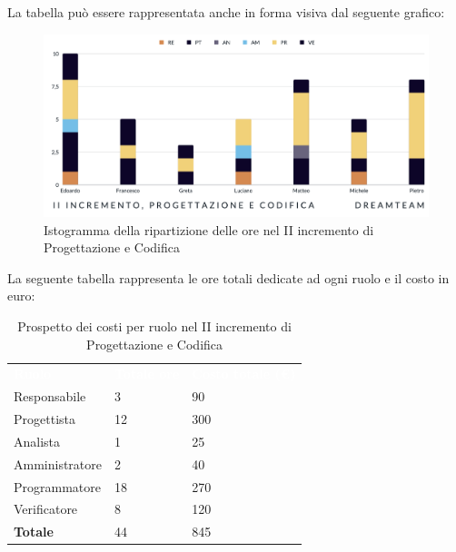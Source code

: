 La tabella può essere rappresentata anche in forma visiva dal seguente grafico:
\begin{figure}[H]
\centering
\includegraphics[scale=0.50]{Sezioni/SezioniPreventivo/grafici/progettazione/Progettazione_II_incremento.png}
\caption{Istogramma della ripartizione delle ore nel II incremento di Progettazione e Codifica}
\end{figure}

La seguente tabella rappresenta le ore totali dedicate ad ogni ruolo e il costo in euro:

\begin{table}[H]
\begin{center}
\renewcommand{\arraystretch}{1.5}
\begin{tabular}{ m{}<{\centering}  m{}<{\centering} m{}<{\centering}}
	\rowcolor{darkblue}
	\textcolor{white}{\textbf{Ruolo}}&\textcolor{white}{\textbf{Totale ore}}&\textcolor{white}{\textbf{Costo totale (\euro)}}\\ 

	Responsabile & 3 & 90 \\	
	
	Progettista & 12 & 300 \\
	
	Analista & 1 & 25 \\

	Amministratore & 2 & 40 \\
	
	Programmatore & 18 & 270 \\
	
	Verificatore & 8 & 120 \\
	
	\textbf{Totale} & 44 & 845 \\
	
\end{tabular}
\caption{Prospetto dei costi per ruolo nel II incremento di Progettazione e Codifica}
\end{center}
\end{table}

